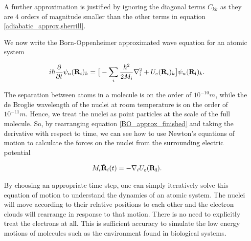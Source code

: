 A further approximation is justified by ignoring the diagonal terms $C_{kk}$ as they are 4 orders of magnitude smaller than the other terms in equation \ref{adiabatic_approx,sherrill}.

We now write the Born-Oppenheimer approximated wave equation for an atomic system  

\begin{equation}
	\label{BO_approx_finished}
	i\hbar \frac{\partial}{\partial t} \psi_n(\bold{R}_i)_k = \big[ -\sum_i \frac{\hbar^2}{2M_i} \nabla^2_i + U_e(\bold{R}_i)_k\big] \psi_n(\bold{R_i})_k.
\end{equation}

The separation between atoms in a molecule is on the order of $10^{-10}m$, while the de Broglie wavelength of the nuclei at room temperature is on the order of $10^{-11}m$. Hence, we treat the nuclei as point particles at the scale of the full molecule. So, by rearranging equation \ref{BO_approx_finished} and taking the derivative with respect to time, we can see how to use Newton's equations of motion to calculate the forces on the nuclei from the surrounding electric potential 

\begin{equation}
	M_i \ddot{\bold{R}}_i (t) = -\nabla_i U_e (\bold{R_i}).
	\label{Newtons_equations}
\end{equation}

By choosing an appropriate time-step, one can simply iteratively solve this equation of motion to understand the dynamics of an atomic system. The nuclei will move according to their relative positions to each other and the electron clouds will rearrange in response to that motion. There is no need to explicitly treat the electrons at all. This is sufficient accuracy to simulate the low energy motions of molecules such as the environment found in biological systems. 
%




%
%
%


